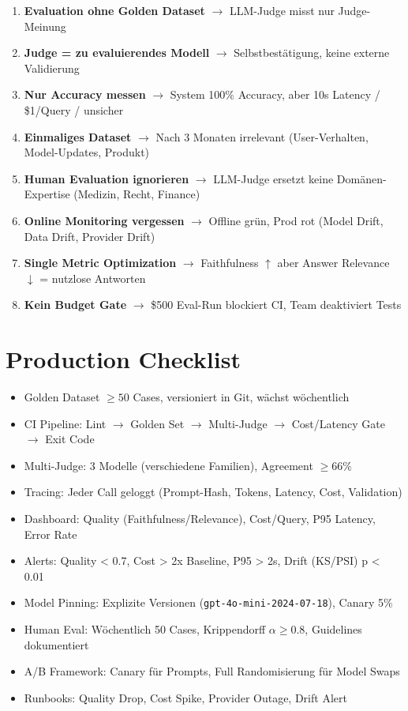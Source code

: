 \begin{enumerate}
    \item \textbf{Evaluation ohne Golden Dataset} $\to$ LLM-Judge misst nur Judge-Meinung
    \item \textbf{Judge = zu evaluierendes Modell} $\to$ Selbstbestätigung, keine externe Validierung
    \item \textbf{Nur Accuracy messen} $\to$ System 100\% Accuracy, aber 10s Latency / \$1/Query / unsicher
    \item \textbf{Einmaliges Dataset} $\to$ Nach 3 Monaten irrelevant (User-Verhalten, Model-Updates, Produkt)
    \item \textbf{Human Evaluation ignorieren} $\to$ LLM-Judge ersetzt keine Domänen-Expertise (Medizin, Recht, Finance)
    \item \textbf{Online Monitoring vergessen} $\to$ Offline grün, Prod rot (Model Drift, Data Drift, Provider Drift)
    \item \textbf{Single Metric Optimization} $\to$ Faithfulness $\uparrow$ aber Answer Relevance $\downarrow$ = nutzlose Antworten
    \item \textbf{Kein Budget Gate} $\to$ \$500 Eval-Run blockiert CI, Team deaktiviert Tests
\end{enumerate}

\section{Production Checklist}

\begin{itemize}
    \item [ ] Golden Dataset $\geq 50$ Cases, versioniert in Git, wächst wöchentlich
    \item [ ] CI Pipeline: Lint $\to$ Golden Set $\to$ Multi-Judge $\to$ Cost/Latency Gate $\to$ Exit Code
    \item [ ] Multi-Judge: 3 Modelle (verschiedene Familien), Agreement $\geq 66\%$
    \item [ ] Tracing: Jeder Call geloggt (Prompt-Hash, Tokens, Latency, Cost, Validation)
    \item [ ] Dashboard: Quality (Faithfulness/Relevance), Cost/Query, P95 Latency, Error Rate
    \item [ ] Alerts: Quality < 0.7, Cost > 2x Baseline, P95 > 2s, Drift (KS/PSI) p < 0.01
    \item [ ] Model Pinning: Explizite Versionen (\texttt{gpt-4o-mini-2024-07-18}), Canary 5\%
    \item [ ] Human Eval: Wöchentlich 50 Cases, Krippendorff $\alpha \geq 0.8$, Guidelines dokumentiert
    \item [ ] A/B Framework: Canary für Prompts, Full Randomisierung für Model Swaps
    \item [ ] Runbooks: Quality Drop, Cost Spike, Provider Outage, Drift Alert
\end{itemize}

